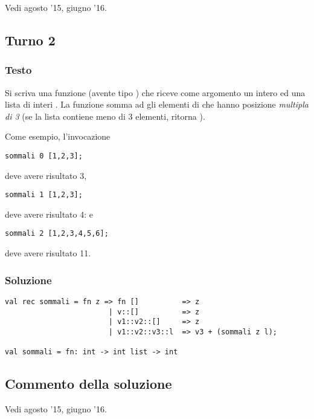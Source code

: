 Vedi agosto '15, giugno '16.


\subsection{Turno 2}

\subsubsection{Testo}

Si scriva una funzione  (avente tipo ) che riceve come argomento un intero  ed una lista di interi .
La funzione  somma ad  gli elementi di  che hanno posizione \emph{multipla di 3} (se la lista contiene meno di 3 elementi,  ritorna ).

\medskip
Come esempio, l'invocazione

\begin{lstlisting}
sommali 0 [1,2,3];
\end{lstlisting}

deve avere risultato 3,

\begin{lstlisting}
sommali 1 [1,2,3];
\end{lstlisting}

deve avere risultato 4: e

\begin{lstlisting}
sommali 2 [1,2,3,4,5,6];
\end{lstlisting}

deve avere risultato 11.

\subsubsection{Soluzione}

\begin{lstlisting}[style = SML, caption = {[Definizione della funzione \sml{sommali} - Turno 2]Definizione della funzione \sml{sommali}}]
val rec sommali = fn z => fn []          => z
						| v::[]          => z
						| v1::v2::[]     => z
						| v1::v2::v3::l  => v3 + (sommali z l);

val sommali = fn: int -> int list -> int
\end{lstlisting}

\subsection{Commento della soluzione}

Vedi agosto '15, giugno '16.
